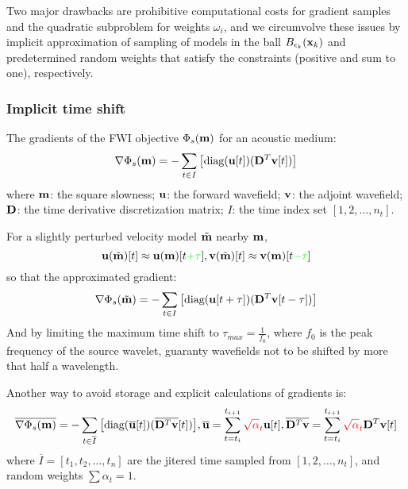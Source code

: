 Two major drawbacks are prohibitive computational costs for gradient samples
and the quadratic subproblem for weights $\omega_i$,
and we circumvolve these issues by implicit approximation of sampling of models
in the ball $B_{\epsilon_k}(\mathbf{x}_k)$
and predetermined random weights that satisfy the constraints
(positive and sum to one), respectively.

\subsubsection{Implicit time shift}
The gradients of the FWI objective $\Phi_s(\mathbf{m})$ for an acoustic medium:
\[ \nabla\Phi_s(\mathbf{m})=-\sum_{t\in I}\big[\text{diag}(\mathbf{u}[t])(\mathbf{D}^T\mathbf{v}[t])\big] \]
where $\mathbf{m}$: the square slowness; $\mathbf{u}$: the forward wavefield; $\mathbf{v}$:
the adjoint wavefield; $\mathbf{D}$: the time derivative discretization matrix; $I$:
the time index set $[1,2,\ldots,n_t]$.

For a slightly perturbed velocity model $\tilde{\mathbf{m}}$ nearby $\mathbf{m}$,
\[ \mathbf{u}(\tilde{\mathbf{m}})[t]\approx\mathbf{u}(\mathbf{m})[t{\color{green}+\tau}],\mathbf{v}(\tilde{\mathbf{m}})[t]\approx\mathbf{v}(\mathbf{m})[t{\color{green}-\tau}] \]
so that the approximated gradient:
\[ \nabla\Phi_s(\tilde{\mathbf{m}})=-\sum_{t\in I}\big[\text{diag}(\mathbf{u}[t+\tau])(\mathbf{D}^T\mathbf{v}[t-\tau])\big] \]
And by limiting the maximum time shift to $\tau_{max}=\frac{1}{f_0}$,
where $f_0$ is the peak frequency of the source wavelet,
guaranty wavefields not to be shifted by more that half a wavelength.

Another way to avoid storage and explicit calculations of gradients is:
\[ \overline{\nabla\Phi_s(\mathbf{m})}=-\sum_{t\in\overline I}\big[\text{diag}(\overline{\mathbf{u}}[t])(\overline{\mathbf{D}^T\mathbf{v}}[t])\big],\overline{\mathbf{u}}=\sum_{t=t_i}^{t_{i+1}}{\color{red}\sqrt\alpha_t}\mathbf{u}[t], \overline{\mathbf{D}^T\mathbf{v}}=\sum_{t=t_i}^{t_{i+1}}{\color{red}\sqrt\alpha_t}\mathbf{D}^T\mathbf{v}[t] \]
where $\overline I=[t_1,t_2,\ldots,t_n]$ are the jitered time sampled from $[1,2,\ldots,n_t]$,
and random weights $\sum\alpha_t=1$.

